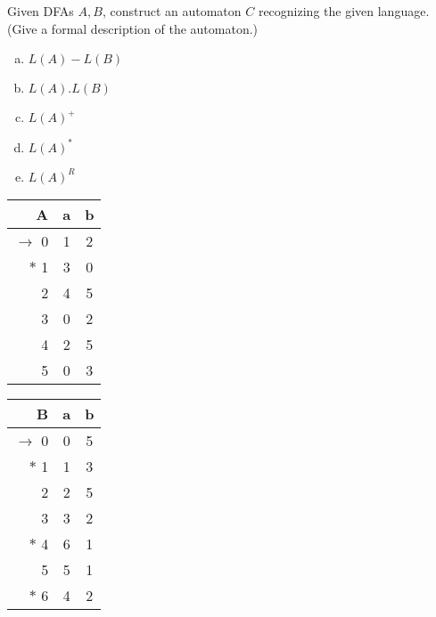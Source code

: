 \documentclass[a4paper,12pt]{amsart}
\begin{document}
\medskip\begin{problem} 
    
    Given DFAs $A,B$, construct an automaton $C$ recognizing the given language. (Give a formal description of the automaton.)
    
    \begin{multicols}{3}

        \begin{enumerate}[(a)]\setlength\itemsep{6pt}
            \item $L(A)-L(B)$
            \item $L(A).L(B)$
            \item $L(A)^+$
            \item $L(A)^*$
            \item $L(A)^R$
        \end{enumerate}

        \begin{tabular}{ r | c c }
            A & a & b \\ \hline
            $\to$ 0 & 1 & 2 \\  
            $\ast$ 1 & 3 & 0 \\
            2 & 4 & 5 \\
            3 & 0 & 2 \\
            4 & 2 & 5 \\
            5 & 0 & 3
        \end{tabular}    
        
        \begin{tabular}{ r | c c }
            B & a & b \\ \hline
            $\to$ 0 & 0 & 5 \\  
            $\ast$ 1 & 1 & 3 \\
            2 & 2 & 5 \\
            3 & 3 & 2 \\
            $\ast$ 4 & 6 & 1 \\
            5 & 5 & 1 \\
            $\ast$ 6 & 4 & 2
        \end{tabular}

    \end{multicols}
    
\end{problem}
\end{document}
